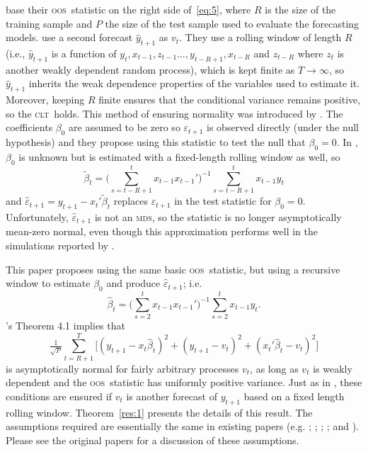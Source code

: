 \documentclass[12pt,fleqn]{article}
\newcommand\citepos[2][]{\citeauthor{#2}'s \citeyearpar[#1]{#2}}
\theoremstyle{definition}
\newcommand{\clt}{\textsc{clt}}
\newcommand{\mds}{\textsc{mds}}
\newcommand{\oos}{\textsc{oos}}
\begin{document}
\citet{ClW:06,ClW:07} base their \oos\ statistic on the right side
of~\eqref{eq:5}, where $R$ is the size of the training sample and $P$
the size of the test sample used to evaluate the forecasting models.
\citet{ClW:06} use a second forecast $\hat{y}_{t+1}$ as $v_t$.  They
use a rolling window of length $R$ (i.e., $\hat{y}_{t+1}$ is a
function of $y_t, x_{t-1}, z_{t-1} \dots, y_{t-R+1}, x_{t-R}$ and
$z_{t-R}$ where $z_t$ is another weakly dependent random process),
which is kept finite as $T \to \infty$, so $\hat{y}_{t+1}$ inherits
the weak dependence properties of the variables used to estimate it.
Moreover, keeping $R$ finite ensures that the conditional variance
remains positive, so the \clt\ holds.  This method of ensuring
normality was introduced by \citet{GiW:06}.  The coefficients
$\beta_0$ are assumed to be zero so $\varepsilon_{t+1}$ is observed
directly (under the null hypothesis) and they propose using this
statistic to test the null that $\beta_0 = 0$.  In \citet{ClW:07},
$\beta_0$ is unknown but is estimated with a fixed-length rolling
window as well, so
\begin{equation*}
  \tilde{\beta}_t = \Big(\sum_{s=t-R+1}^t x_{t-1} x_{t-1}'\Big)^{-1}
  \sum_{s=t-R+1}^t x_{t-1} y_t
\end{equation*}
and $\hat{\varepsilon}_{t+1} = y_{t+1} - x_t'\tilde{\beta}_t$ replaces
$\varepsilon_{t+1}$ in the test statistic for $\beta_0 = 0$.
Unfortunately, $\hat{\varepsilon}_{t+1}$ is not an \mds, so the
statistic is no longer asymptotically mean-zero normal, even though
this approximation performs well in the simulations reported by
\citet{ClW:07}.

This paper proposes using the same basic \oos\ statistic, 
but using a recursive window to estimate $\beta_0$ and produce
$\hat{\varepsilon}_{t+1}$; i.e.
\begin{equation}
  \label{eq:8}
  \hat{\beta}_t = \Big(\sum_{s=2}^{t} x_{t-1} x_{t-1}'\Big)^{-1}
  \sum_{s=2}^t x_{t-1} y_t.
\end{equation}
\citepos{Wes:96} Theorem 4.1 implies that
\begin{equation*}
  \tfrac{1}{\sqrt{P}} \sum_{t=R+1}^T \Big[(y_{t+1} -
  x_t\hat{\beta}_t)^2 + (y_{t+1} - v_t)^2 + (x_t'\hat{\beta}_t - v_t)^2 \Big]
\end{equation*}
is asymptotically normal for fairly arbitrary processes $v_t$, as long
as $v_t$ is weakly dependent and the \oos\ statistic has uniformly
positive variance.  Just as in \citet{ClW:06}, these conditions are
ensured if $v_t$ is another forecast of $y_{t+1}$ based on a fixed
length rolling window.  Theorem~\ref{res:1} presents the details of
this result.  The assumptions required are essentially the same in
existing papers (e.g. \citealp{Wes:96}; \citealp{WeM:98};
\citealp{Mcc:00}; \citealp{GiW:06}; and \citealp{ClW:06,ClW:07}).
Please see the original papers for a discussion of these assumptions.
\end{document}
